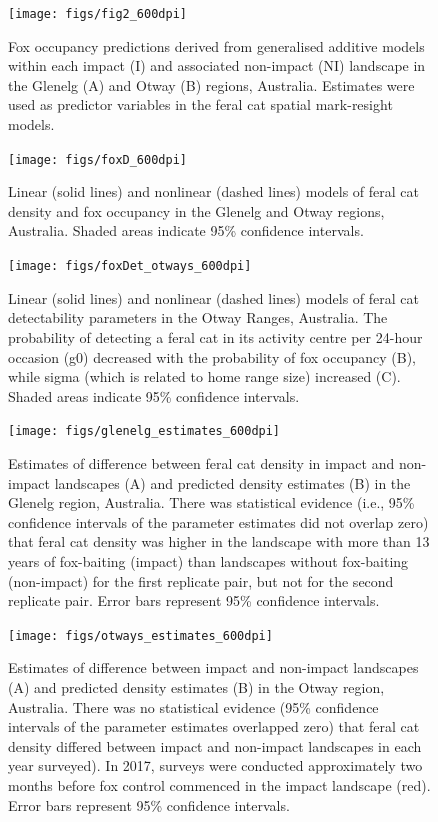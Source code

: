 \documentclass[]{elsarticle} %
\begin{document}
\newpage

\begin{figure}
\texttt{[image: figs/fig2\_600dpi]} \caption{Fox occupancy predictions derived from generalised additive models within each impact (I) and associated non-impact (NI) landscape in the Glenelg (A) and Otway (B) regions, Australia. Estimates were used as predictor variables in the feral cat spatial mark-resight models.}\label{fig:foxplot}
\end{figure}

\newpage

\begin{figure}
\texttt{[image: figs/foxD\_600dpi]} \caption{Linear (solid lines) and nonlinear (dashed lines) models of feral cat density and fox occupancy in the Glenelg and Otway regions, Australia. Shaded areas indicate 95\% confidence intervals.}\label{fig:dcor}
\end{figure}

\newpage

\begin{figure}
\texttt{[image: figs/foxDet\_otways\_600dpi]} \caption{Linear (solid lines) and nonlinear (dashed lines) models of feral cat detectability parameters in the Otway Ranges, Australia. The probability of detecting a feral cat in its activity centre per 24-hour occasion (g0) decreased with the probability of fox occupancy (B), while sigma (which is related to home range size) increased (C). Shaded areas indicate 95\% confidence intervals.}\label{fig:detcor}
\end{figure}

\newpage

\begin{figure}
\texttt{[image: figs/glenelg\_estimates\_600dpi]} \caption{Estimates of difference between feral cat density in impact and non-impact landscapes (A) and predicted density estimates (B) in the Glenelg region, Australia. There was statistical evidence (i.e., 95\% confidence intervals of the parameter estimates did not overlap zero) that feral cat density was higher in the landscape with more than 13 years of fox-baiting (impact) than landscapes without fox-baiting (non-impact) for the first replicate pair, but not for the second replicate pair. Error bars represent 95\% confidence intervals.}\label{fig:diffg}
\end{figure}

\newpage

\begin{figure}
\texttt{[image: figs/otways\_estimates\_600dpi]} \caption{Estimates of difference between impact and non-impact landscapes (A) and predicted density estimates (B) in the Otway region, Australia. There was no statistical evidence (95\% confidence intervals of the parameter estimates overlapped zero) that feral cat density differed between impact and non-impact landscapes in each year surveyed). In 2017, surveys were conducted approximately two months before fox control commenced in the impact landscape (red). Error bars represent 95\% confidence intervals.}\label{fig:diffo}
\end{figure}
\end{document}
